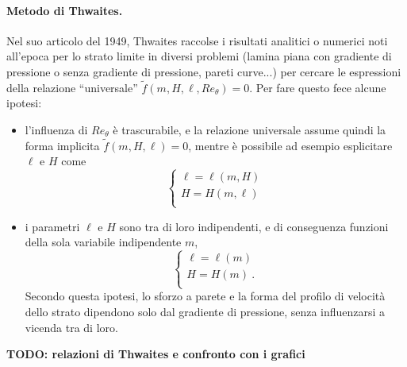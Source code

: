 \paragraph{Metodo di Thwaites.}
Nel suo articolo del 1949, Thwaites raccolse i risultati analitici o numerici noti all'epoca per lo strato limite in diversi problemi (lamina piana con gradiente di pressione o senza gradiente di pressione, pareti curve...) per cercare le espressioni della relazione ``universale'' $\tilde{f}(m, H, \ell, Re_{\theta}) = 0$. Per fare questo fece alcune ipotesi:
\begin{itemize}
 \item l'influenza di $Re_{\theta}$ è trascurabile, e la relazione universale assume quindi la forma implicita $\tilde{f}(m,H,\ell) = 0$, mentre è possibile ad esempio esplicitare $\ell$ e $H$ come
 \begin{equation}
  \begin{cases}
   \ell = \ell(m, H) \\
   H    = H(m, \ell) \\
  \end{cases}
 \end{equation}
\item i parametri $\ell$ e $H$ sono tra di loro indipendenti, e di conseguenza funzioni della sola variabile indipendente $m$,
 \begin{equation}
  \begin{cases}
   \ell = \ell(m) \\
   H    =    H(m) \ . \\
  \end{cases}
 \end{equation}
 Secondo questa ipotesi, lo sforzo a parete e la forma del profilo di velocità dello strato dipendono solo dal gradiente di pressione, senza influenzarsi a vicenda tra di loro.
\end{itemize}

\textbf{TODO: relazioni di Thwaites e confronto con i grafici}


